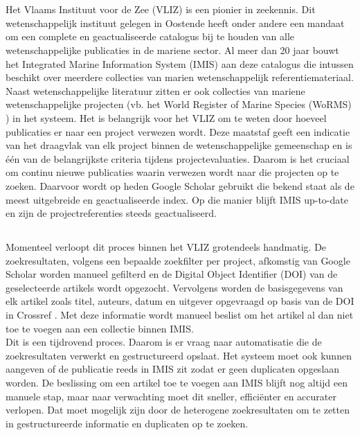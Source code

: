 
\chapter{}%
\label{ch:inleiding}

Het Vlaams Instituut voor de Zee (VLIZ) \autocite{Vliz2024} is een pionier in zeekennis. Dit wetenschappelijk instituut gelegen in Oostende heeft onder andere een mandaat om een complete en geactualiseerde catalogus bij te houden van alle wetenschappelijke publicaties in de mariene sector. Al meer dan 20 jaar bouwt het Integrated Marine Information System (IMIS) aan deze catalogus die intussen beschikt over meerdere collecties van marien wetenschappelijk referentiemateriaal.\\
Naast wetenschappelijke literatuur zitten er ook collecties van mariene wetenschappelijke projecten (vb. het World Register of Marine Species (WoRMS) \autocite{Worms2024}) in het systeem. Het is belangrijk voor het VLIZ om te weten door hoeveel publicaties er naar een project verwezen wordt. Deze maatstaf geeft een indicatie van het draagvlak van elk project binnen de wetenschappelijke gemeenschap en is één van de belangrijkste criteria tijdens projectevaluaties. Daarom is het cruciaal om continu nieuwe publicaties waarin verwezen wordt naar die projecten op te zoeken. Daarvoor wordt op heden Google Scholar gebruikt die bekend staat als de meest uitgebreide en geactualiseerde index. Op die manier blijft IMIS up-to-date en zijn de projectreferenties steeds geactualiseerd.

\section{}%
\label{sec:probleemstelling}

Momenteel verloopt dit proces binnen het VLIZ grotendeels handmatig. De zoekresultaten, volgens een bepaalde zoekfilter per project, afkomstig van Google Scholar worden manueel gefilterd en de Digital Object Identifier (DOI) van de geselecteerde artikels wordt opgezocht.
Vervolgens worden de basisgegevens van elk artikel zoals titel, auteurs, datum en uitgever opgevraagd op basis van de DOI in Crossref \autocite{Crossref2024}. Met deze informatie wordt manueel beslist om het artikel al dan niet toe te voegen aan een collectie binnen IMIS.\\
Dit is een tijdrovend proces. Daarom is er vraag naar automatisatie die de zoekresultaten verwerkt en gestructureerd opslaat. Het systeem moet ook kunnen aangeven of de publicatie reeds in IMIS zit zodat er geen duplicaten opgeslaan worden. De beslissing om een artikel toe te voegen aan IMIS blijft nog altijd een manuele stap, maar naar verwachting moet dit sneller, efficiënter en accurater verlopen. Dat moet mogelijk zijn door de heterogene zoekresultaten om te zetten in gestructureerde informatie en duplicaten op te zoeken.

